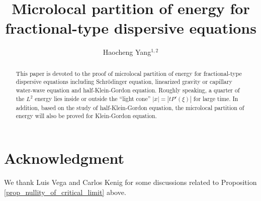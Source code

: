 \documentclass[12pt,a4paper,leqno]{amsart}
\title{Microlocal partition of energy for fractional-type dispersive equations}
\author{Haocheng Yang$^{1,2}$}
\numberwithin{equation}{section}
\begin{document}

\newcommand{\Op}[2][]{\operatorname{Op}^{#1}\left(#2\right)}
\newcommand{\Supp}[1]{\operatorname{Supp} #1}
\newcommand{\sgn}[1]{\operatorname{sgn}\left(#1\right)}
\newcommand{\Real}{\operatorname{Re}}
\newcommand{\Imaginary}{\operatorname{Im}}

\newcommand{\mar}[1]{\marginpar{\textcolor{red}{#1}}}

\begin{abstract}
This paper is devoted to the proof of microlocal partition of energy for fractional-type dispersive equations including Schrödinger equation, linearized gravity or capillary water-wave equation and half-Klein-Gordon equation. Roughly speaking, a quarter of the $L^2$ energy lies inside or outside the ``light cone'' $|x| = |tP'(\xi)|$ for large time. In addition, based on the study of half-Klein-Gordon equation, the microlocal partition of energy will also be proved for Klein-Gordon equation.
\end{abstract}

\maketitle




\section*{Acknowledgment}
We thank Luis Vega and Carlos Kenig for some discussions related to Proposition \ref{prop_nullity_of_critical_limit} above.









\appendix














\end{document}
